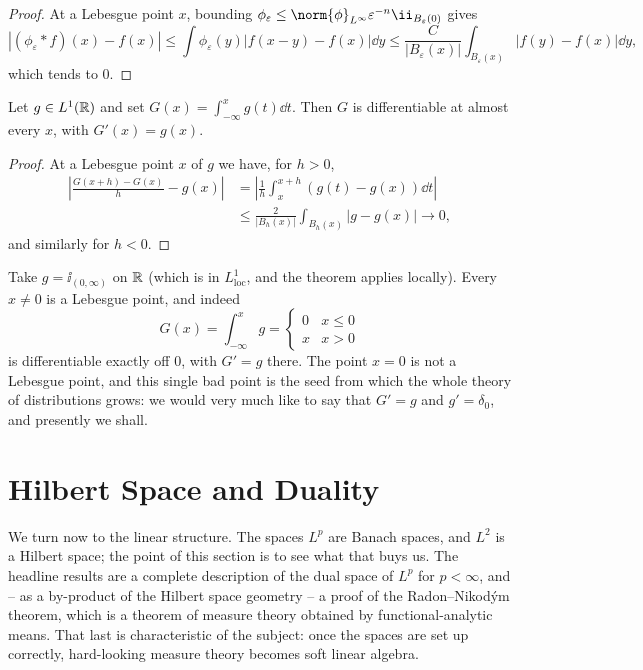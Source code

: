 \documentclass[a4paper]{scrartcl}
\begin{document}
\begin{proof}
	At a Lebesgue point $x$, bounding $\phi_\varepsilon \le \norm{\phi}_{L^\infty}\varepsilon^{-n}\ii_{B_\varepsilon(0)}$ gives
	$$|(\phi_\varepsilon * f)(x) - f(x)| \le \int \phi_\varepsilon(y)|f(x-y)-f(x)| \dd y \le \frac{C}{|B_\varepsilon(x)|}\int_{B_\varepsilon(x)}|f(y)-f(x)|\dd y,$$
	which tends to $0$.
\end{proof}

\begin{corollary}\label{cor:ftc}
	Let $g \in L^1(\mathbb{R})$ and set $G(x) = \int_{-\infty}^x g(t) \dd t$. Then $G$ is differentiable at almost every $x$, with $G'(x) = g(x)$.
\end{corollary}

\begin{proof}
	At a Lebesgue point $x$ of $g$ we have, for $h > 0$,
	\begin{align*}
		\left| \frac{G(x+h)-G(x)}{h} - g(x) \right| &= \left|\frac 1h \int_x^{x+h} (g(t)-g(x))\dd t \right| \\
		&\le \frac{2}{|B_h(x)|}\int_{B_h(x)}|g-g(x)| \to 0,
	\end{align*}
	and similarly for $h < 0$.
\end{proof}

\begin{example}
	Take $g = \ii_{(0,\infty)}$ on $\mathbb{R}$ (which is in $L^1_{\mathrm{loc}}$, and the theorem applies locally). Every $x \ne 0$ is a Lebesgue point, and indeed
	$$G(x) = \int_{-\infty}^x g = \begin{cases} 0 & x \le 0 \\ x & x > 0\end{cases}$$
	is differentiable exactly off $0$, with $G' = g$ there. The point $x=0$ is not a Lebesgue point, and this single bad point is the seed from which the whole theory of distributions grows: we would very much like to say that $G' = g$ and $g' = \delta_0$, and presently we shall.
\end{example}

\section{Hilbert Space and Duality}\label{sec:duality}

We turn now to the linear structure. The spaces $L^p$ are Banach spaces, and $L^2$ is a Hilbert space; the point of this section is to see what that buys us. The headline results are a complete description of the dual space of $L^p$ for $p < \infty$, and -- as a by-product of the Hilbert space geometry -- a proof of the Radon--Nikod\'ym theorem, which is a theorem of measure theory obtained by functional-analytic means. That last is characteristic of the subject: once the spaces are set up correctly, hard-looking measure theory becomes soft linear algebra.
\end{document}
